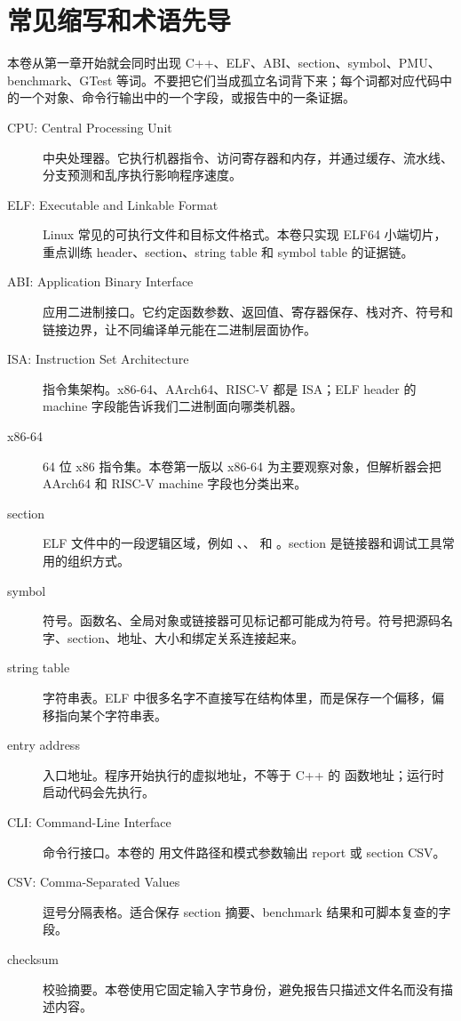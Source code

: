 \chapter*{常见缩写和术语先导}
{}

本卷从第一章开始就会同时出现 C++、ELF、ABI、section、symbol、PMU、benchmark、GTest 等词。不要把它们当成孤立名词背下来；每个词都对应代码中的一个对象、命令行输出中的一个字段，或报告中的一条证据。

\begin{description}
  \item[CPU: Central Processing Unit] 中央处理器。它执行机器指令、访问寄存器和内存，并通过缓存、流水线、分支预测和乱序执行影响程序速度。
  \item[ELF: Executable and Linkable Format] Linux 常见的可执行文件和目标文件格式。本卷只实现 ELF64 小端切片，重点训练 header、section、string table 和 symbol table 的证据链。
  \item[ABI: Application Binary Interface] 应用二进制接口。它约定函数参数、返回值、寄存器保存、栈对齐、符号和链接边界，让不同编译单元能在二进制层面协作。
  \item[ISA: Instruction Set Architecture] 指令集架构。x86-64、AArch64、RISC-V 都是 ISA；ELF header 的 machine 字段能告诉我们二进制面向哪类机器。
  \item[x86-64] 64 位 x86 指令集。本卷第一版以 x86-64 为主要观察对象，但解析器会把 AArch64 和 RISC-V machine 字段也分类出来。
  \item[section] ELF 文件中的一段逻辑区域，例如 、、 和 。section 是链接器和调试工具常用的组织方式。
  \item[symbol] 符号。函数名、全局对象或链接器可见标记都可能成为符号。符号把源码名字、section、地址、大小和绑定关系连接起来。
  \item[string table] 字符串表。ELF 中很多名字不直接写在结构体里，而是保存一个偏移，偏移指向某个字符串表。
  \item[entry address] 入口地址。程序开始执行的虚拟地址，不等于 C++ 的  函数地址；运行时启动代码会先执行。
  \item[CLI: Command-Line Interface] 命令行接口。本卷的  用文件路径和模式参数输出 report 或 section CSV。
  \item[CSV: Comma-Separated Values] 逗号分隔表格。适合保存 section 摘要、benchmark 结果和可脚本复查的字段。
  \item[checksum] 校验摘要。本卷使用它固定输入字节身份，避免报告只描述文件名而没有描述内容。

\end{description}
